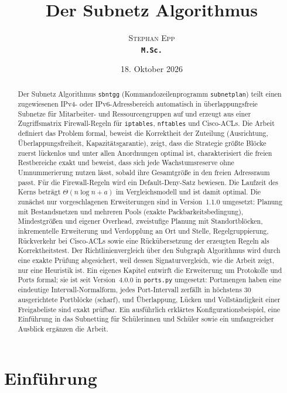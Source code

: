 \documentclass[a4paper,12pt, twoside]{report}
\title{\textbf{Der Subnetz Algorithmus}}
\author{\textsc{Stephan Epp}\\ {\small \texttt{\textbf{M.Sc.}}}}
\date{18. Oktober 2026}
\theoremstyle{definition}
\begin{document}

\maketitle

\begin{abstract}
\noindent
Der Subnetz Algorithmus \texttt{sbntgg} (Kommandozeilenprogramm \texttt{subnetplan}) teilt einen zugewiesenen IPv4- oder IPv6-Adressbereich automatisch in überlappungsfreie Subnetze für Mitarbeiter- und Ressourcengruppen auf und erzeugt aus einer Zugriffsmatrix Firewall-Regeln für \texttt{iptables}, \texttt{nftables} und Cisco-ACLs.
Die Arbeit definiert das Problem formal, beweist die Korrektheit der Zuteilung (Ausrichtung, Überlappungsfreiheit, Kapazitätsgarantie), zeigt, dass die Strategie \glqq größte Blöcke zuerst\grqq{} lückenlos und unter allen Anordnungen optimal ist, charakterisiert die freien Restbereiche exakt und beweist, dass sich jede Wachstumsreserve ohne Umnummerierung nutzen lässt, sobald ihre Gesamtgröße in den freien Adressraum passt.
Für die Firewall-Regeln wird ein Default-Deny-Satz bewiesen.
Die Laufzeit des Kerns beträgt $\Theta(n\log n + a)$ im Vergleichsmodell und ist damit optimal.
Die zunächst nur vorgeschlagenen Erweiterungen sind in Version~1.1.0 umgesetzt: Planung mit Bestandsnetzen und mehreren Pools (exakte Packbarkeitsbedingung), Mindestgrößen und eigener Overhead, zweistufige Planung mit Standortblöcken, inkrementelle Erweiterung und Verdopplung an Ort und Stelle, Regelgruppierung, Rückverkehr bei Cisco-ACLs sowie eine Rückübersetzung der erzeugten Regeln als Korrektheitstest.
Der Richtlinienvergleich über den Subgraph Algorithmus wird durch eine exakte Prüfung abgesichert, weil dessen Signaturvergleich, wie die Arbeit zeigt, nur eine Heuristik ist.
Ein eigenes Kapitel entwirft die Erweiterung um Protokolle und Ports formal; sie ist seit Version~4.0.0 in \texttt{ports.py} umgesetzt: Portmengen haben eine eindeutige Intervall-Normalform, jedes Port-Intervall zerfällt in höchstens $30$ ausgerichtete Portblöcke (scharf), und Überlappung, Lücken und Vollständigkeit einer Freigabeliste sind exakt prüfbar.
Ein ausführlich erklärtes Konfigurationsbeispiel, eine Einführung in das Subnetting für Schülerinnen und Schüler sowie ein umfangreicher Ausblick ergänzen die Arbeit.
\end{abstract}

\tableofcontents
\newpage

\chapter{Einführung}
\end{document}
